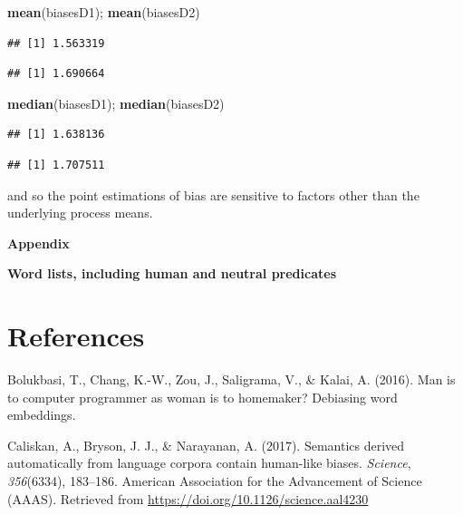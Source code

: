 \documentclass[10pt,dvipsnames,enabledeprecatedfontcommands]{scrartcl}
\newenvironment{Shaded}{\begin{snugshade}}{\end{snugshade}}
\newcommand{\KeywordTok}[1]{\textcolor[rgb]{0.13,0.29,0.53}{\textbf{#1}}}
\newcommand{\NormalTok}[1]{#1}
\begin{document}
\vspace{1mm} \footnotesize

\begin{Shaded}
\begin{Highlighting}[]
\KeywordTok{mean}\NormalTok{(biasesD1); }\KeywordTok{mean}\NormalTok{(biasesD2)}
\end{Highlighting}
\end{Shaded}

\begin{verbatim}
## [1] 1.563319
\end{verbatim}

\begin{verbatim}
## [1] 1.690664
\end{verbatim}

\begin{Shaded}
\begin{Highlighting}[]
\KeywordTok{median}\NormalTok{(biasesD1); }\KeywordTok{median}\NormalTok{(biasesD2)}
\end{Highlighting}
\end{Shaded}

\begin{verbatim}
## [1] 1.638136
\end{verbatim}

\begin{verbatim}
## [1] 1.707511
\end{verbatim}

\normalsize
and so the point estimations of bias are sensitive to factors other than
the underlying process means.

\newpage

\noindent \huge  \textbf{Appendix} \normalsize

\noindent \Large \textbf{Word lists, including human and neutral predicates}
\normalsize

\section*{References}\label{references}

\vspace{-3mm}

\hypertarget{refs}{}
\hypertarget{ref-bolukbasi2016man}{}
Bolukbasi, T., Chang, K.-W., Zou, J., Saligrama, V., \& Kalai, A.
(2016). Man is to computer programmer as woman is to homemaker?
Debiasing word embeddings.

\hypertarget{ref-Caliskan2017semanticsBiases}{}
Caliskan, A., Bryson, J. J., \& Narayanan, A. (2017). Semantics derived
automatically from language corpora contain human-like biases.
\emph{Science}, \emph{356}(6334), 183--186. American Association for the
Advancement of Science (AAAS). Retrieved from
\url{https://doi.org/10.1126/science.aal4230}
\end{document}
